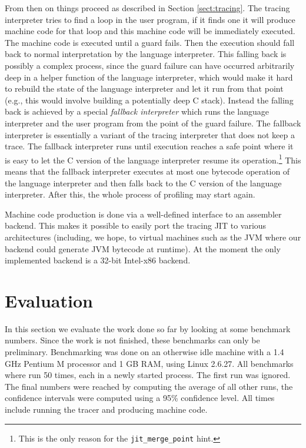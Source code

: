 \documentclass{sig-alternate}
\newcommand\eg{e.g.,\xspace}
\begin{document}
From then on things proceed as described in Section \ref{sect:tracing}. The
tracing interpreter tries to find a loop in the user program, if it finds one it
will produce machine code for that loop and this machine code will be
immediately executed. The machine code is executed until a guard fails. Then the
execution should fall back to normal interpretation by the language interpreter.
This falling back is possibly a complex process, since the guard failure can
have occurred arbitrarily deep in a helper function of the language interpreter,
which would make it hard to rebuild the state of the language interpreter and
let it run from that point (\eg this would involve building a potentially deep
C stack). Instead the falling back is achieved by a special \emph{fallback
interpreter} which runs the language interpreter and the user program from the
point of the guard failure. The fallback interpreter is essentially a variant of
the tracing interpreter that does not keep a trace. The fallback interpreter
runs until execution reaches a safe point where it is easy to let the C version
of the language interpreter resume its operation.\footnote{This is the only
reason for the \texttt{jit\_merge\_point} hint.}  This means that the
fallback interpreter executes at most one bytecode operation of the language
interpreter and then falls back to the C version of the language interpreter.
After this, the whole process of profiling may start again.

Machine code production is done via a well-defined interface to an assembler
backend. This makes it possible to easily port the tracing JIT to various
architectures (including, we hope, to virtual machines such as the JVM where
our backend could generate JVM bytecode at runtime). At the moment the only
implemented backend is a 32-bit Intel-x86 backend.


\section{Evaluation}
\label{sect:evaluation}

In this section we evaluate the work done so far by looking at some
benchmark numbers. Since the work is not finished, these benchmarks can only be
preliminary. Benchmarking was done on an otherwise idle machine with a 1.4
GHz Pentium M processor and 1 GB RAM, using Linux 2.6.27. All benchmarks where
run 50 times, each in a newly started process. The first run was ignored. The
final numbers were reached by computing the average of all other runs, the
confidence intervals were computed using a 95\% confidence level. All times
include running the tracer and producing machine code.
\end{document}
